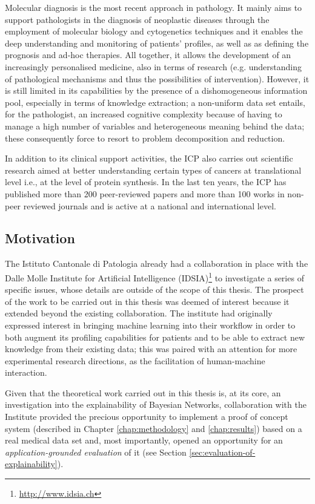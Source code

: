 Molecular diagnosis is the most recent approach in pathology. It mainly aims to support pathologists in the diagnosis of neoplastic diseases through the employment of molecular biology and cytogenetics techniques and it enables the deep understanding and monitoring of patients' profiles, as well as as defining the prognosis and ad-hoc therapies. All together, it allows the development of an increasingly personalised medicine, also in terms of research (e.g. understanding of pathological mechanisms and thus the possibilities of intervention).
However, it is still limited in its capabilities by the presence of a dishomogeneous information pool, especially in terms of knowledge extraction; a non-uniform data set entails, for the pathologist, an increased cognitive complexity because of having to manage a high number of variables and heterogeneous meaning behind the data; these consequently force to resort to problem decomposition and reduction.

In addition to its clinical support activities, the ICP also carries out scientific research aimed at better understanding certain types of cancers at translational level i.e., at the level of protein synthesis.
In the last ten years, the ICP has published more than 200 peer-reviewed papers and more than 100 works in non-peer reviewed journals and is active at a national and international level.

\subsection{Motivation} \label{subsec:motivation}
The Istituto Cantonale di Patologia already had a collaboration in place with the Dalle Molle Institute for Artificial Intelligence (IDSIA)\footnote{\url{http://www.idsia.ch}} to investigate a series of specific issues, whose details are outside of the scope of this thesis.
The prospect of the work to be carried out in this thesis was deemed of interest because it extended beyond the existing collaboration.
The institute had originally expressed interest in bringing machine learning into their workflow in order to both augment its profiling capabilities for patients and to be able to extract new knowledge from their existing data; this was paired with an attention for more experimental research directions, as the facilitation of human-machine interaction.

Given that the theoretical work carried out in this thesis is, at its core, an investigation into the explainability of Bayesian Networks, collaboration with the Institute provided the precious opportunity to implement a proof of concept system (described in Chapter \ref{chap:methodology} and \ref{chap:results}) based on a real medical data set and, most importantly, opened an opportunity for an \textit{application-grounded evaluation} of it (see Section \ref{sec:evaluation-of-explainability}).

